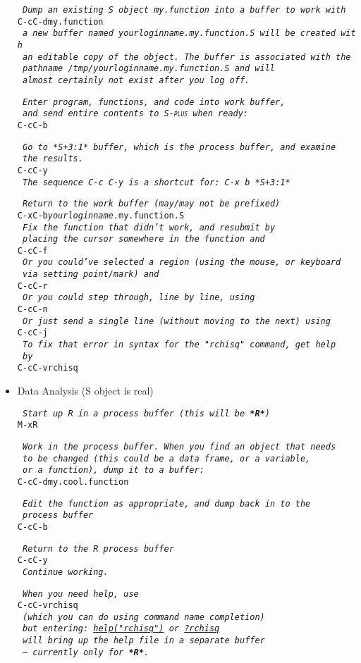 \documentclass{article}
\newcommand*{\Splus}{\textsc{S-plus}}
\newcommand*{\Scmt}[1]{\hbox{\qquad {\footnotesize \#\#} \textsl{#1}}}
\newenvironment{Salltt}{\small\begin{alltt}}{\end{alltt}}
\begin{document}
\begin{itemize}
\begin{Salltt}
  \Scmt{Dump an existing S object my.function into a buffer to work with}
  C-c C-d my.function
  \Scmt{a new buffer named \textit{yourloginname}.my.function.S will be created with}
  \Scmt{an editable copy of the object.  The buffer is associated with the}
  \Scmt{pathname {\footnotesize /tmp/\textit{yourloginname}.my.function.S} and will}
  \Scmt{almost certainly not exist after you log off.}

  \Scmt{Enter program, functions, and code into work buffer,}
  \Scmt{and send entire contents to \Splus\ when ready:}
  C-c C-b

  \Scmt{Go to *S+3:1* buffer, which is the process buffer, and examine}
  \Scmt{the results.}
  C-c C-y
  \Scmt{The sequence C-c C-y is a shortcut for:  C-x b *S+3:1*}

  \Scmt{Return to the work buffer (may/may not be prefixed)}
  C-x C-b \textit{yourloginname}.my.function.S
  \Scmt{Fix the function that didn't work, and resubmit by}
  \Scmt{placing the cursor somewhere in the function and}
  C-c C-f
  \Scmt{Or you could've selected a region (using the mouse, or keyboard}
  \Scmt{via setting point/mark) and}
  C-c C-r
  \Scmt{Or you could step through, line by line, using}
  C-c C-n
  \Scmt{Or just send a single line (without moving to the next) using}
  C-c C-j
  \Scmt{To fix that error in syntax for the "rchisq" command, get help}
  \Scmt{by}
  C-c C-v rchisq
\end{Salltt}
\item Data Analysis (S object is real)
\begin{Salltt}
  \Scmt{Start up R in a process buffer (this will be \textbf{*R*})} 
  M-x R

  \Scmt{Work in the process buffer.  When you find an object that needs}
  \Scmt{to be changed (this could be a data frame, or a variable,}
  \Scmt{or a function), dump it to a buffer:}
  C-c C-d my.cool.function

  \Scmt{Edit the function as appropriate, and dump back in to the}
  \Scmt{process buffer}
  C-c C-b

  \Scmt{Return to the R process buffer}
  C-c C-y
  \Scmt{Continue working.}

  \Scmt{When you need help, use}
  C-c C-v rchisq
  \Scmt{(which you can do using command name completion)}
  \Scmt{but entering:   \underline{help("rchisq")} or  \underline{?rchisq}}
  \Scmt{will bring up the help file in a separate buffer}
  \Scmt{\emph{--- currently only for \textbf{*R*}}.}
\end{Salltt}
\end{itemize}
\end{document}
